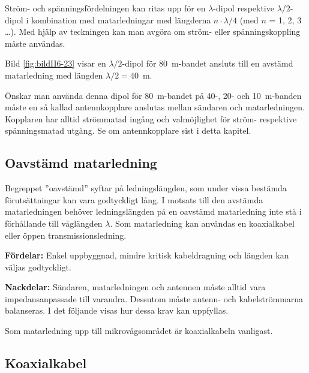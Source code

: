 Ström- och spänningsfördelningen kan ritas upp för en \(\lambda\)-dipol
respektive \(\lambda/2\)-dipol i kombination med matarledningar med längderna
\(n \cdot \lambda/4\) (med \(n\) = 1, 2, 3 \dots).
Med hjälp av teckningen kan man avgöra om ström- eller spänningskoppling måste
användas.


Bild \ref{fig:bildII6-23} visar en \(\lambda/2\)-dipol för 80~m-bandet ansluts
till en avstämd matarledning med längden \(\lambda/2 = 40\)~m.

Önskar man använda denna dipol för 80~m-bandet på 40-, 20- och 10~m-banden
måste en så kallad antennkopplare anslutas mellan sändaren och matarledningen.
Kopplaren har alltid strömmatad ingång och valmöjlighet för ström- respektive
spänningsmatad utgång.
Se om antennkopplare sist i detta kapitel.

\subsection{Oavstämd matarledning}
\label{oavstämd_matarledning}

Begreppet ''oavstämd'' syftar på ledningslängden, som under vissa
bestämda förutsättningar kan vara godtyckligt lång.
I motsats till den avstämda matarledningen behöver ledningslängden på en
oavstämd matarledning inte stå i förhållande till våglängden \(\lambda\).
Som matarledning kan användas en koaxialkabel eller öppen transmissionsledning.

\textbf{Fördelar:}
Enkel uppbyggnad, mindre kritisk kabeldragning och längden kan väljas godtyckligt.

\textbf{Nackdelar:}
Sändaren, matarledningen och antennen måste alltid vara impedansanpassade till
varandra.
Dessutom måste antenn- och kabelströmmarna balanseras.
I det följande visas hur dessa krav kan uppfyllas.

Som matarledning upp till mikrovågsområdet är koaxialkabeln vanligast.

\subsection{Koaxialkabel}


